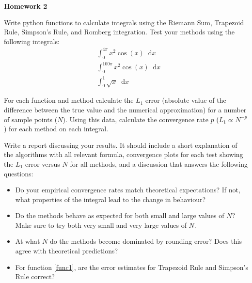 \documentclass{article}
\newcommand*\diff{\mathop{}\!\mathrm{d}}
\begin{document}
\begin{center}

\vspace*{-2.5cm}
\LARGE
\bf{Homework 2}
\vspace{1cm}
\end{center}

Write python functions to calculate integrals using the Riemann Sum, Trapezoid Rule, Simpson's Rule, and Romberg integration.  Test your methods using the following integrals:
\begin{align}
& \int_0^{4\pi} x^2 \cos(x) \diff x \label{func1}\\
& \int_0^{100\pi} x^2 \cos(x) \diff x \\
& \int_0^1 \sqrt{x} \diff x 
\end{align}

For each function and method calculate the $L_1$ error (absolute value of the difference between the true value and the numerical approximation) for a number of sample points ($N$).  Using this data, calculate the convergence rate $p$ ($L_1 \propto N^{-p}$) for each method on each integral.

Write a report discussing your results. It should include a short explanation of the algorithms with all relevant formula, convergence plots for each test showing the $L_1$ error versus $N$ for all methods, and a discussion that answers the following questions:
\begin{itemize}
	\item Do your empirical convergence rates match theoretical expectations? If not, what properties of the integral lead to the change in behaviour?
	\item Do the methods behave as expected for both small and large values of $N$?  Make sure to try both very small and very large values of $N$.
	\item At what $N$ do the methods become dominated by rounding error?  Does this agree with theoretical predictions?
	\item For function \eqref{func1}, are the error estimates for Trapezoid Rule and Simpson's Rule correct?
\end{itemize}
\end{document}
